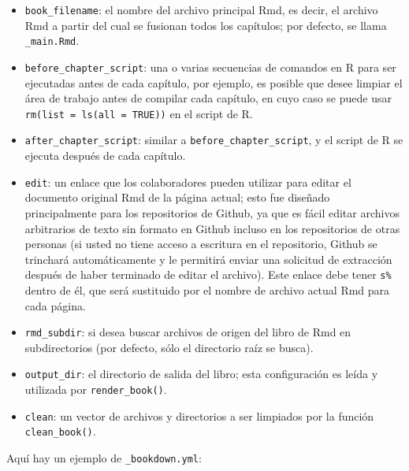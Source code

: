 \documentclass[12pt,]{krantz}
\makeatletter
\newenvironment{Shaded}{\begin{snugshade}}{\end{snugshade}}
\newcommand{\KeywordTok}[1]{\textcolor[rgb]{0.13,0.29,0.53}{\textbf{#1}}}
\newcommand{\StringTok}[1]{\textcolor[rgb]{0.31,0.60,0.02}{#1}}
\newcommand{\FunctionTok}[1]{\textcolor[rgb]{0.00,0.00,0.00}{#1}}
\newcommand{\AttributeTok}[1]{\textcolor[rgb]{0.77,0.63,0.00}{#1}}
\providecommand{\tightlist}{%
  \setlength{\itemsep}{0pt}\setlength{\parskip}{0pt}}
\newenvironment{kframe}{%
\medskip{}
\setlength{\fboxsep}{.8em}
 \def\at@end@of@kframe{}%
 \ifinner\ifhmode%
  \def\at@end@of@kframe{\end{minipage}}%
  \begin{minipage}{\columnwidth}%
 \fi\fi%
 \def\FrameCommand##1{\hskip\@totalleftmargin \hskip-\fboxsep
 \colorbox{shadecolor}{##1}\hskip-\fboxsep
     \hskip-\linewidth \hskip-\@totalleftmargin \hskip\columnwidth}%
 \MakeFramed {\advance\hsize-\width
   \@totalleftmargin\z@ \linewidth\hsize
   \@setminipage}}%
 {\par\unskip\endMakeFramed%
 \at@end@of@kframe}
\renewenvironment{Shaded}{\begin{kframe}}{\end{kframe}}
\theoremstyle{definition}
\theoremstyle{definition}
\theoremstyle{definition}
\theoremstyle{remark}
\makeatother
\begin{document}
\begin{itemize}
\tightlist
\item
  \texttt{book\_filename}: el nombre del archivo principal Rmd, es
  decir, el archivo Rmd a partir del cual se fusionan todos los
  capítulos; por defecto, se llama \texttt{\_main.Rmd}.
\item
  \texttt{before\_chapter\_script}: una o varias secuencias de comandos
  en R para ser ejecutadas antes de cada capítulo, por ejemplo, es
  posible que desee limpiar el área de trabajo antes de compilar cada
  capítulo, en cuyo caso se puede usar
  \texttt{rm(list\ =\ ls(all\ =\ TRUE))} en el script de R.
\item
  \texttt{after\_chapter\_script}: similar a
  \texttt{before\_chapter\_script}, y el script de R se ejecuta después
  de cada capítulo.
\item
  \texttt{edit}: un enlace que los colaboradores pueden utilizar para
  editar el documento original Rmd de la página actual; esto fue
  diseñado principalmente para los repositorios de Github, ya que es
  fácil editar archivos arbitrarios de texto sin formato en Github
  incluso en los repositorios de otras personas (si usted no tiene
  acceso a escritura en el repositorio, Github se trinchará
  automáticamente y le permitirá enviar una solicitud de extracción
  después de haber terminado de editar el archivo). Este enlace debe
  tener \texttt{s\%} dentro de él, que será sustituido por el nombre de
  archivo actual Rmd para cada página.
\item
  \texttt{rmd\_subdir}: si desea buscar archivos de origen del libro de
  Rmd en subdirectorios (por defecto, sólo el directorio raíz se
  busca).\\
\item
  \texttt{output\_dir}: el directorio de salida del libro; esta
  configuración es leída y utilizada por \texttt{render\_book()}.
\item
  \texttt{clean}: un vector de archivos y directorios a ser limpiados
  por la función \texttt{clean\_book()}.
\end{itemize}

Aquí hay un ejemplo de \texttt{\_bookdown.yml}:

\begin{Shaded}
\end{Shaded}
\end{document}
